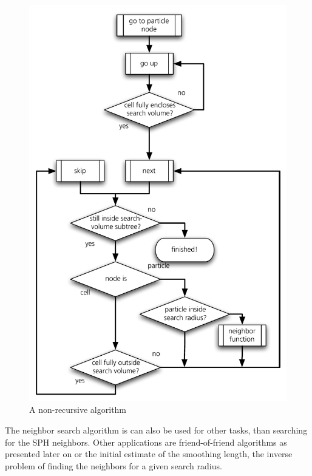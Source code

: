 \begin{figure}[htbp]
\begin{center}
\includegraphics[scale=0.6]{16algo_neighsearch.pdf}
\caption{A non-recursive algorithm }
\label{ch02_fig16}
\end{center}
\end{figure}

The neighbor search algorithm is can also be used for other tasks, than searching for the SPH neighbors. Other applications are friend-of-friend algorithms as presented later on or the initial estimate of the smoothing length, the inverse problem of finding the neighbors for a given search radius.

